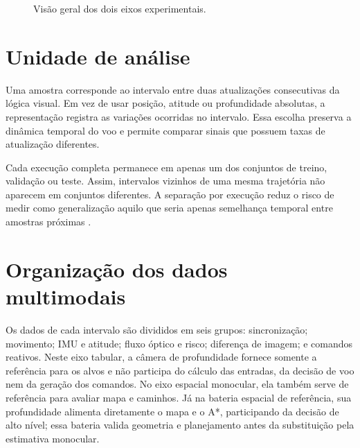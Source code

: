 \begin{figure}[htb]
\centering
{}
\caption{Visão geral dos dois eixos experimentais.}
\label{fig:fluxo-dois-eixos}
\end{figure}

\section{Unidade de análise}

Uma amostra corresponde ao intervalo entre duas atualizações consecutivas da lógica visual. Em vez de usar posição, atitude ou profundidade absolutas, a representação registra as variações ocorridas no intervalo. Essa escolha preserva a dinâmica temporal do voo e permite comparar sinais que possuem taxas de atualização diferentes.

Cada execução completa permanece em apenas um dos conjuntos de treino, validação ou teste. Assim, intervalos vizinhos de uma mesma trajetória não aparecem em conjuntos diferentes. A separação por execução reduz o risco de medir como generalização aquilo que seria apenas semelhança temporal entre amostras próximas \cite{Kapoor2023}.

\section{Organização dos dados multimodais}

Os dados de cada intervalo são divididos em seis grupos: sincronização; movimento; IMU e atitude; fluxo óptico e risco; diferença de imagem; e comandos reativos. Neste eixo tabular, a câmera de profundidade fornece somente a referência para os alvos e não participa do cálculo das entradas, da decisão de voo nem da geração dos comandos. No eixo espacial monocular, ela também serve de referência para avaliar mapa e caminhos. Já na bateria espacial de referência, sua profundidade alimenta diretamente o mapa e o A*, participando da decisão de alto nível; essa bateria valida geometria e planejamento antes da substituição pela estimativa monocular.

